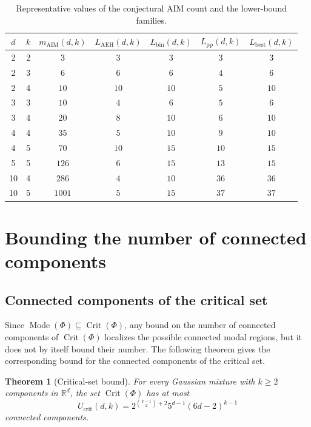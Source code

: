 \documentclass[11pt]{article}
\theoremstyle{plain}
\newtheorem{theorem}{Theorem}[section]
\theoremstyle{definition}
\theoremstyle{remark}
\numberwithin{equation}{section}
\DeclareMathOperator{\Crit}{Crit}
\DeclareMathOperator{\Mode}{Mode}
\newcommand{\R}{\mathbb{R}}
\begin{document}
\begin{table}[htbp]
\centering
\caption{Representative values of the conjectural AIM count and the lower-bound families.}
\label{tab:lower-comparison}
\small
\begin{tabular}{ccccccc}
\toprule
$d$ & $k$ & $m_{\mathrm{AIM}}(d,k)$ & $L_{\mathrm{AEH}}(d,k)$ & $L_{\mathrm{bin}}(d,k)$ & $L_{\mathrm{pp}}(d,k)$ & $L_{\mathrm{best}}(d,k)$ \\
\midrule
2 & 2 & $3$ & $3$ & $3$ & $3$ & $3$ \\
2 & 3 & $6$ & $6$ & $6$ & $4$ & $6$ \\
2 & 4 & $10$ & $10$ & $10$ & $5$ & $10$ \\
3 & 3 & $10$ & $4$ & $6$ & $5$ & $6$ \\
3 & 4 & $20$ & $8$ & $10$ & $6$ & $10$ \\
4 & 4 & $35$ & $5$ & $10$ & $9$ & $10$ \\
4 & 5 & $70$ & $10$ & $15$ & $10$ & $15$ \\
5 & 5 & $126$ & $6$ & $15$ & $13$ & $15$ \\
10 & 4 & $286$ & $4$ & $10$ & $36$ & $36$ \\
10 & 5 & $1001$ & $5$ & $15$ & $37$ & $37$ \\
\bottomrule
\end{tabular}
\end{table}
\section{Bounding the number of connected components}\label{sec:modal-regions}


\subsection{Connected components of the critical set}\label{subsec:critical-components}

Since $\Mode(\Phi)\subseteq \Crit(\Phi)$, any bound on the number of connected components of $\Crit(\Phi)$ localizes the possible connected modal regions, but it does not by itself bound their number. The following theorem gives the corresponding bound for the connected components of the critical set. 

\begin{theorem}[Critical-set bound]\label{thm:crit-components}
For every Gaussian mixture with $k\ge 2$ components in $\R^d$, the set $\Crit(\Phi)$ has at most
\[
U_{\mathrm{crit}}(d,k)=2^{\binom{k-1}{2}+2}5^{d-1}(6d-2)^{k-1}
\]
connected components.
\end{theorem}
\end{document}

